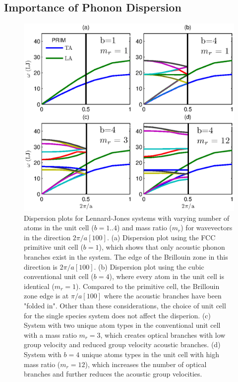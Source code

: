 \documentclass[letterpaper,12pt]{article}
\begin{document}
\subsection{\label{S-Prelim-Phonon-Dispersion}Importance of Phonon Dispersion}
\begin{figure}
\begin{center}
\includegraphics[scale=0.6]{GULP_disp_mass_ratio.eps}
\vspace*{-5mm}
\end{center}
\caption{\label{FIG:crys_disp_mass_ratio} Dispersion plots for Lennard-Jones systems with varying number of atoms in the unit cell ($b=1..4$) and mass ratio ($m_r$) for wavevectors in the direction $2\pi/a[1 0 0]$. (a) Dispersion plot using the FCC primitive unit cell ($b=1$), which shows that only acoustic phonon branches exist in the system. The edge of the Brillouin zone in this direction is $2\pi/a[1 0 0]$. (b) Dispersion plot using the cubic conventional unit cell ($b=4$), where every atom in the unit cell is identical ($m_r=1$). Compared to the primitive cell, the Brillouin zone edge is at $\pi/a[1 0 0]$ where the acoustic branches have been "folded in".\cite{turneythesis} Other than these considerations, the choice of unit cell for the single species system does not affect the disperion. (c) System with two unique atom types in the conventional unit cell with a mass ratio $m_r=3$, which creates optical branches with low group velocity and reduced group velocity acoustic branches. (d) System with $b=4$ unique atoms types in the unit cell with high mass ratio ($m_r=12$), which increases the number of optical branches and further reduces the acoustic group velocities. }
\end{figure}
\end{document}
